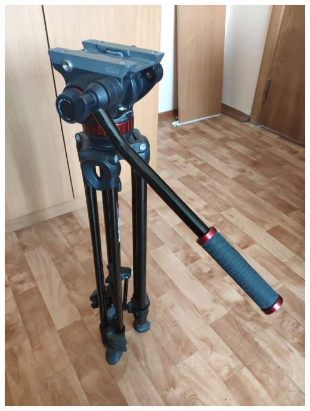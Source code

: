 \begin{enumerate}
\begin{enumerate}
                \begin{minipage}[c]{0.4\textwidth}
                  \includegraphics[width=\textwidth]{Images/PortableCamera/tripod/fold-handle-on.jpg}
                \end{minipage}
                \hfill
                \begin{minipage}[c]{0.4\textwidth}

\end{minipage}
\end{enumerate}
\end{enumerate}
